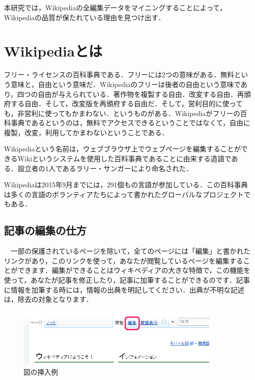 本研究では，Wikipediaの全編集データをマイニングすることによって，Wikipediaの品質が保たれている理由を見つけ出す．



\section{Wikipediaとは}

フリー・ライセンスの百科事典である．フリーには2つの意味がある．無料という意味と，自由という意味だ．Wikipediaのフリーは後者の自由という意味であり，四つの自由が与えられている．著作物を複製する自由．改変する自由．再頒府する自由．そして，改変版を再頒府する自由だ．そして，営利目的に使っても，非営利に使ってもかまわない．というものがある．Wikipediaがフリーの百科事典であるというのは，無料でアクセスできるということではなくて，自由に複製，改変，利用してかまわないということである．

Wikipediaという名前は，ウェブブラウザ上でウェブページを編集することができるWikiというシステムを使用した百科事典であることに由来する造語である．設立者の1人であるラリー・サンガーにより命名された．

Wikipediaは2015年9月までには，291個もの言語が参加している．この百科事典は多くの言語のボランティアたちによって書かれたグローバルなプロジェクトでもある．



\subsection{記事の編集の仕方}

　一部の保護されているページを除いて，全てのページには「編集」と書かれたリンクがあり，このリンクを使って，あなたが閲覧しているページを編集することができます．編集ができることはウィキペディアの大きな特徴で，この機能を使って，あなたが記事を修正したり，記事に加筆することができるのです．記事に情報を加筆する時には，情報の出典を明記してください．出典が不明な記述は，除去の対象となります．

\begin{figure}[H]
\centering
\includegraphics[width=10cm]{sample1.png}
\caption{図の挿入例}\label{サンプル図}
\end{figure}

